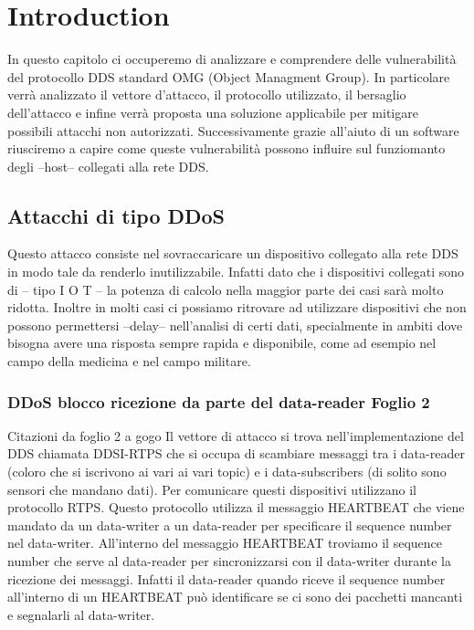 \chapter{Introduction}


In questo capitolo ci occuperemo di analizzare e comprendere delle vulnerabilità
del protocollo DDS standard OMG (Object Managment Group). In particolare
verrà analizzato il vettore d'attacco, il protocollo utilizzato, il bersaglio
dell'attacco e infine verrà proposta una soluzione applicabile per
mitigare possibili attacchi non autorizzati. Successivamente grazie all'aiuto 
di un software riusciremo a capire come queste vulnerabilità possono 
influire sul funziomanto degli --host-- collegati alla rete DDS.


\section{Attacchi di tipo DDoS}
Questo attacco consiste nel sovraccaricare un dispositivo collegato alla rete DDS
in modo tale da renderlo inutilizzabile. Infatti dato che i dispositivi collegati
sono di -- tipo I O T -- la potenza di calcolo nella maggior parte dei casi sarà
molto ridotta. Inoltre in molti casi ci possiamo ritrovare ad utilizzare dispositivi
che non possono permettersi --delay-- nell'analisi di certi dati, specialmente in
ambiti dove bisogna avere una risposta sempre rapida e disponibile, come ad esempio
nel campo della medicina e nel campo militare.


\subsection{DDoS blocco ricezione da parte del data-reader Foglio 2}

Citazioni da foglio 2 a gogo
Il vettore di attacco si trova nell'implementazione del DDS chiamata DDSI-RTPS che
si occupa di scambiare messaggi tra i data-reader (coloro che si iscrivono ai vari
ai vari topic) e i data-subscribers (di solito sono sensori che mandano dati). Per
comunicare questi dispositivi utilizzano il protocollo RTPS. 
Questo protocollo utilizza il messaggio HEARTBEAT che viene mandato da un data-writer 
a un data-reader per specificare il sequence number nel data-writer.
All'interno del messaggio HEARTBEAT troviamo il sequence number che serve al 
data-reader per sincronizzarsi con il data-writer durante la ricezione dei messaggi. 
Infatti il data-reader quando riceve il sequence number all'interno di un HEARTBEAT
può identificare se ci sono dei pacchetti mancanti e segnalarli al
data-writer.

